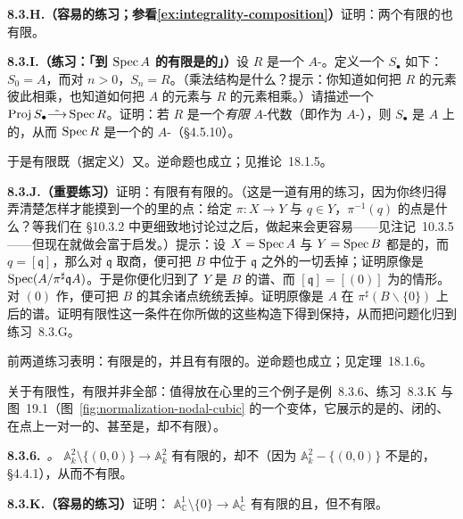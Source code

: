 \textbf{8.3.H.（容易的练习；参看\cref{ex:integrality-composition}）}\quad 证明：两个有限\trMorphism{}的\trComposition{}也有限。

\textbf{8.3.I.（练习：「到 $\operatorname{Spec} A$ 的有限\trMorphism{}是\trProjective{}的」）}\quad 设 $R$ 是一个 $A$-\trAlgebra。定义一个\trGradedRing{} $S_\bullet$ 如下：$S_0=A$，而对 $n>0$，$S_n=R$。（乘法结构是什么？提示：你知道如何把 $R$ 的元素彼此相乘，也知道如何把 $A$ 的元素与 $R$ 的元素相乘。）请描述一个\trIsomorphism{} $\operatorname{Proj} S_\bullet\tilde{\longrightarrow}\operatorname{Spec} R$。证明：若 $R$ 是一个\emph{有限} $A$-代数（即作为 $A$-\trModule{}\trFinitelyGenerated），则 $S_\bullet$ 是 $A$ 上\trFinitelyGenerated{}的\trGradedRing，从而 $\operatorname{Spec} R$ 是一个\trProjective{}的 $A$-\trScheme（\S4.5.10）。

于是有限\trMorphism{}既\trAffine（据定义）又\trProjective。逆命题也成立；见\mbox{推论~18.1.5}。

\textbf{8.3.J.（重要练习）}\quad 证明：有限\trMorphism{}有有限的\trFiber。（这是一道有用的练习，因为你终归得弄清楚怎样才能摸到一个\trMorphism{}的\trFiber{}里的点：给定 $\pi\colon X\to Y$ 与 $q\in Y$，$\pi^{-1}(q)$ 的点是什么？等我们在 \S10.3.2 中更细致地讨论过\trFiber{}之后，做起来会更容易——见注记~10.3.5——但现在就做会富于启发。）提示：设 $X=\operatorname{Spec} A$ 与 $Y=\operatorname{Spec} B$ 都是\trAffine{}的，而 $q=[\mathfrak{q}]$，那么对 $\mathfrak{q}$ 取商，便可把 $B$ 中位于 $\mathfrak{q}$ 之外的一切丢掉；证明原像是 $\operatorname{Spec}(A/\pi^\sharp\mathfrak{q}A)$。于是你便化归到了 $Y$ 是\trIntegralDomain{} $B$ 的谱、而 $[\mathfrak{q}]=[(0)]$ 为\trGenericPoint{}的情形。对 $(0)$ 作\trLocalization，便可把 $B$ 的其余诸点统统丢掉。证明原像是 $A$ 在 $\pi^\sharp(B\smallsetminus\{0\})$ 上\trLocalization{}后的谱。证明有限性这一条件在你所做的这些构造下得到保持，从而把问题化归到练习~8.3.G。

前两道练习表明：有限\trMorphism{}是\trProjective{}的，并且有有限的\trFiber。逆命题也成立；见\mbox{定理~18.1.6}。

关于有限性，\trFiber{}有限并非全部：值得放在心里的三个例子是例~8.3.6、练习~8.3.K 与图~19.1（图~\ref{fig:normalization-nodal-cubic} 的一个变体，它展示的\trMorphism{}是\trAffine{}的、闭的、在点上一对一的、甚至是\trMonomorphism，却不有限）。

\textbf{8.3.6.}\ \emph{\trhExample{}。}\quad \trOpenEmbedding{} $\mathbb{A}^2_k\setminus\{(0,0)\}\to\mathbb{A}^2_k$ 有有限的\trFiber，却不\trAffine（因为 $\mathbb{A}^2_k-\{(0,0)\}$ 不是\trAffine{}的，\S4.4.1），从而不有限。

\textbf{8.3.K.（容易的练习）}\quad 证明：\trOpenEmbedding{} $\mathbb{A}^1_{\mathbb{C}}\setminus\{0\}\to\mathbb{A}^1_{\mathbb{C}}$ 有有限的\trFiber{}且\trAffine，但不有限。

